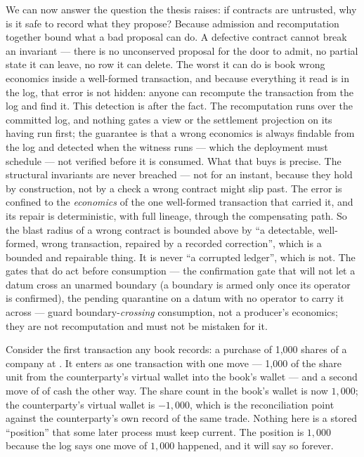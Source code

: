We can now answer the question the thesis raises: if contracts are untrusted, why
is it safe to record what they propose? Because admission and recomputation
together bound what a bad proposal can do. A defective contract cannot break an
invariant --- there is no unconserved proposal for the door to admit, no partial
state it can leave, no row it can delete. The worst it can do is book wrong
economics inside a well-formed transaction, and because everything it read is in
the log, that error is not hidden: anyone can recompute the transaction from the
log and find it. This detection is after the fact. The recomputation runs over the
committed log, and nothing gates a view or the settlement projection on its having
run first; the guarantee is that a wrong economics is always findable from the log
and detected when the witness runs --- which the deployment must schedule --- not
verified before it is consumed. What that buys is precise. The structural invariants are never
breached --- not for an instant, because they hold by construction, not by a check
a wrong contract might slip past. The error is confined to the \emph{economics} of
the one well-formed transaction that carried it, and its repair is deterministic,
with full lineage, through the compensating path. So the blast radius of a wrong
contract is bounded above by ``a detectable, well-formed, wrong transaction,
repaired by a recorded correction'', which is a bounded and repairable thing. It is
never ``a corrupted ledger'', which is not. The gates that do act before
consumption --- the confirmation gate that will not let a datum cross an unarmed
boundary (a boundary is armed only once its operator is confirmed), the pending
quarantine on a datum with no operator to carry it across ---
guard boundary-\emph{crossing} consumption, not a producer's economics; they are
not recomputation and must not be mistaken for it.

Consider the first transaction any book records: a purchase of 1{,}000 shares of a
company at . It enters as one transaction with one move --- 1{,}000 of
the share unit from the counterparty's virtual wallet into the book's wallet ---
and a second move of  of cash the other way. The share count in the
book's wallet is now $1{,}000$; the counterparty's virtual wallet is $-1{,}000$,
which is the reconciliation point against the counterparty's own record of the
same trade. Nothing here is a stored ``position'' that some later process must
keep current. The position is $1{,}000$ because the log says one move of
$1{,}000$ happened, and it will say so forever.

